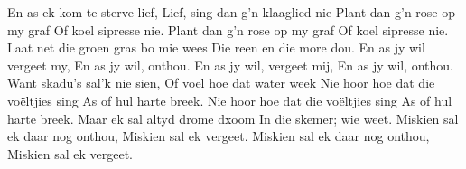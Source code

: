 \beginverse*
En as ek kom te sterve lief,
Lief, sing dan g'n klaaglied nie
Plant dan g'n rose op my graf
Of koel sipresse nie.
Plant dan g'n rose op my graf
Of koel sipresse nie.
\endverse
\beginverse*
Laat net die groen gras bo mie wees
Die reen en die more dou.
En as jy wil vergeet my,
En as jy wil, onthou.
En as jy wil, vergeet mij,
En as jy wil, onthou.
\endverse
\beginverse*
Want skadu's sal'k nie sien,
Of voel hoe dat water week
Nie hoor hoe dat die voëltjies sing
As of hul harte breek.
Nie hoor hoe dat die voëltjies sing
As of hul harte breek.
\endverse
\beginverse*
Maar ek sal altyd drome dxoom
In die skemer; wie weet.
Miskien sal ek daar nog onthou,
Miskien sal ek vergeet.
Miskien sal ek daar nog onthou,
Miskien sal ek vergeet.
\endverse
\endsong